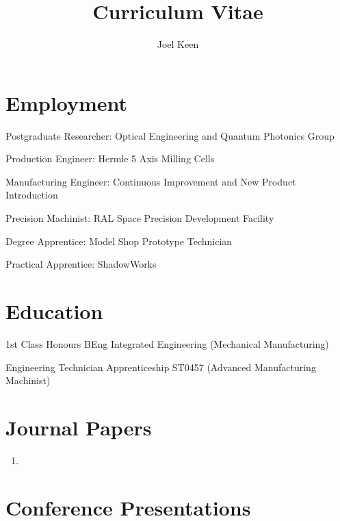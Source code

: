 \documentclass{cv}
\title{Curriculum Vitae}
\author{Joel Keen}
\begin{document}


\maketitle

\section{Employment}

Postgraduate Researcher: Optical Engineering and Quantum Photonics Group

Production Engineer: Hermle 5 Axis Milling Cells

Manufacturing Engineer: Continuous Improvement and New Product Introduction

Precision Machinist: RAL Space Precision Development Facility

Degree Apprentice: Model Shop Prototype Technician 

Practical Apprentice: ShadowWorks

\section{Education}

1st Class Honours BEng Integrated Engineering (Mechanical Manufacturing)

 Engineering Technician Apprenticeship ST0457 (Advanced Manufacturing Machinist)

\section{Journal Papers}
\begin{enumerate}

\item{}

\end{enumerate}

\section{Conference Presentations}
\end{document}
